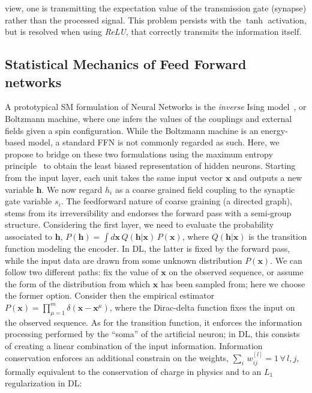\documentclass{article}
\begin{document}
view, one is transmitting the expectation value of the transmission gate (synapse) rather than the processed signal. This problem persists with the $\tanh$ activation, but is resolved when using {\it ReLU}, that correctly transmits the information itself.

\subsection{Statistical Mechanics of Feed Forward networks}

A prototypical SM formulation of Neural Networks is the {\it inverse} Ising model~\cite{zecchina}, or Boltzmann machine, where one infers the values of the couplings and external fields given a spin configuration.  While the Boltzmann machine is an energy-based model, a standard FFN is not commonly regarded as such. Here, we propose to bridge on these two formulations using the maximum entropy principle~\cite{zecchina, roberto, mckay, jaynes} to obtain the least biased representation of hidden neurons. Starting from the input layer, each unit takes the same input vector $\mathbf{x}$ and outputs a new variable $\mathbf{h}$. We now regard $h_i$ as a coarse grained field coupling to the synaptic gate variable $s_i$. The feedforward nature of coarse graining (a directed graph), stems from its irreversibility and endorses the forward pass with a semi-group structure. Considering the first layer, we need to evaluate the probability associated to  $\mathbf{h}$, $P(\mathbf{h}) =  \int d \mathbf{x} \, Q(\mathbf{h} | \mathbf{x} ) \, P(\mathbf{x})$, where  $Q(\mathbf{h} | \mathbf{x} )$ is the transition function modeling the encoder. In DL, the latter is fixed by the forward pass, while the input data are drawn from some unknown distribution $P(\mathbf{x})$. We can follow two different paths: fix the value of $\mathbf{x}$ on the observed sequence, or assume the form of the distribution from which $\mathbf{x}$ has been sampled from; here we choose the former option. Consider then the empirical estimator $P(\mathbf{x}) =  \prod_{\mu=1}^m  \delta( \mathbf{x} - \mathbf{x}^{\mu} )$, where the Dirac-delta function  fixes the input on the observed sequence. As for the transition function, it enforces the information processing performed by the ``soma'' of the artificial neuron; in DL, this consists of creating a linear combination of the input information. Information conservation enforces an additional constrain on the weights, $\sum_i \, w_{ij}^{[l]} =1 \, \forall \, l,j$, formally equivalent to the conservation of charge in physics and to an $L_1$ regularization in DL:
\end{document}
